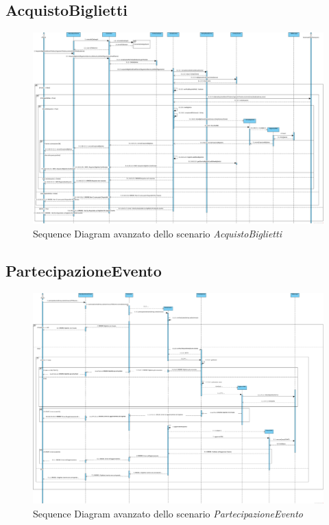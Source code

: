 \subsection*{AcquistoBiglietti}
\begin{figure}[H]
\centering
\includegraphics[width=\linewidth]{assets/SDProgettazione/AcquistoBigliettiProgettazione.png}
\caption{Sequence Diagram avanzato dello scenario \textit{AcquistoBiglietti}}
\end{figure}

\subsection*{PartecipazioneEvento}
\begin{figure}[H]
\centering
\includegraphics[width=\linewidth]{assets/SDProgettazione/PartecipazioneEventoProgettazione.png}
\caption{Sequence Diagram avanzato dello scenario \textit{PartecipazioneEvento} }
\end{figure}






